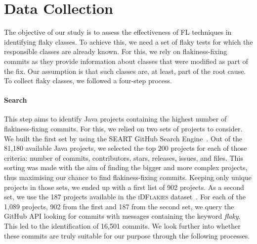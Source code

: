\section{Data Collection}
\label{sec:sherloc-data}

The objective of our study is to assess the effectiveness of FL techniques in identifying flaky classes.
To achieve this, we need a set of flaky tests for which the responsible classes are already known. 
For this, we rely on flakiness-fixing commits as they provide information about classes that were modified as part of the fix.
Our assumption is that such classes are, at least, part of the root cause.
To collect flaky classes, we followed a four-step process.

\paragraph{Search} 
This step aims to identify Java projects containing the highest number of flakiness-fixing commits. For this, we relied on two sets of projects to consider. 
We built the first set by using the SEART GitHub Search Engine~\cite{githubsearch}. Out of the 81,180 available Java projects, we selected the top 200 projects for each of those criteria: number of commits, contributors, stars, releases, issues, and files. This sorting was made with the aim of finding the bigger and more complex projects, thus maximising our chance to find flakiness-fixing commits. 
Keeping only unique projects in those sets, we ended up with a first list of 902 projects. As a second set, we use the 187 projects available in the \textsc{iDFlakies} dataset~\cite{Lam2019iDFlakies}. 
For each of the 1,089 projects, 902 from the first and 187 from the second set, we query the GitHub API looking for commits with messages containing the keyword \textit{flaky}. This led to the identification of 16,501 commits.
We look further into whether these commits are truly suitable for our purpose through the following processes. 

\newcommand\mch[2]{\multicolumn{1}{>{\centering\arraybackslash}b{#1}}{#2}}


